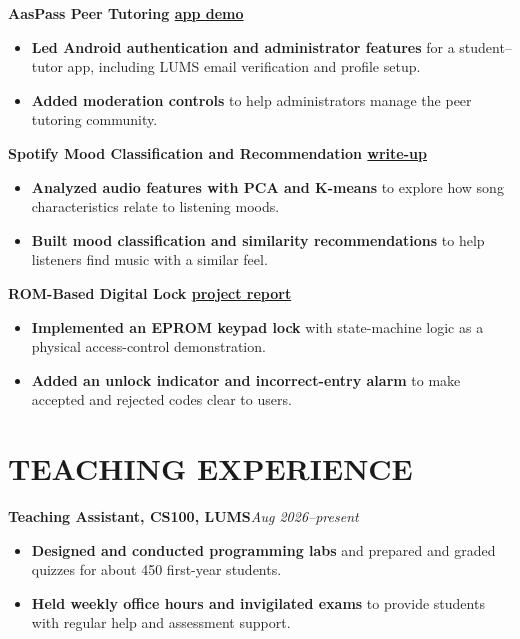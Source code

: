 \documentclass[10pt]{article}
\newcommand{\entry}[3]{\textbf{#1}\hfill {\small\itshape #2}\\[-1pt]{#3}\par}
\newcommand{\link}[2]{\href{#1}{#2}}
\begin{document}
\entry{AasPass Peer Tutoring \textperiodcentered{} \link{https://drive.google.com/drive/folders/1dZr6n9DSSht6m3_ncmZnLsxQ2xPbCkZq}{app demo}}{}{}
\begin{itemize}
\item \textbf{Led Android authentication and administrator features} for a student--tutor app, including LUMS email verification and profile setup.
\item \textbf{Added moderation controls} to help administrators manage the peer tutoring community.
\end{itemize}
\entry{Spotify Mood Classification and Recommendation \textperiodcentered{} \link{https://medium.com/@khadijah.aamir.ch/spotting-the-vibe-using-machine-learning-techniques-to-predict-song-mood-and-provide-music-6a4544c3de8e}{write-up}}{}{}
\begin{itemize}
\item \textbf{Analyzed audio features with PCA and K-means} to explore how song characteristics relate to listening moods.
\item \textbf{Built mood classification and similarity recommendations} to help listeners find music with a similar feel.
\end{itemize}
\entry{ROM-Based Digital Lock \textperiodcentered{} \link{https://kac224.github.io/assets/rom-based-digital-lock-report.pdf}{project report}}{}{}
\begin{itemize}
\item \textbf{Implemented an EPROM keypad lock} with state-machine logic as a physical access-control demonstration.
\item \textbf{Added an unlock indicator and incorrect-entry alarm} to make accepted and rejected codes clear to users.
\end{itemize}
\section*{TEACHING EXPERIENCE}
\entry{Teaching Assistant, CS100, LUMS}{Aug 2026--present}{}
\begin{itemize}
\item \textbf{Designed and conducted programming labs} and prepared and graded quizzes for about 450 first-year students.
\item \textbf{Held weekly office hours and invigilated exams} to provide students with regular help and assessment support.
\end{itemize}
\end{document}
